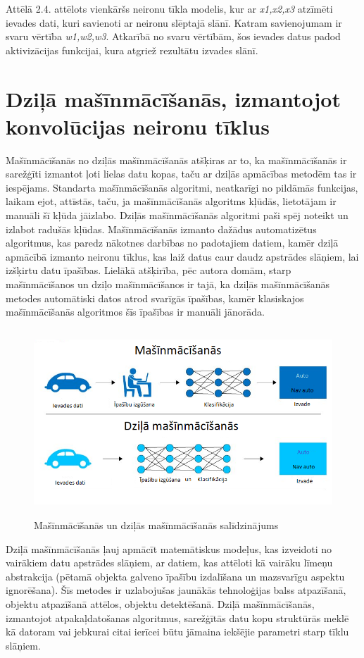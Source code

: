 Attēlā 2.4. attēlots vienkāršs neironu tīkla modelis, kur ar \textit{x1,x2,x3} atzīmēti ievades dati, kuri savienoti ar neironu slēptajā slānī. Katram savienojumam ir svaru vērtība \textit{w1,w2,w3}. Atkarībā no svaru vērtībām, šos ievades datus padod aktivizācijas funkcijai, kura atgriež rezultātu izvades slānī.
\section{Dziļā mašīnmācīšanās, izmantojot konvolūcijas neironu tīklus}
Mašīnmācīšanās no dziļās mašīnmācīšanās atšķiras ar to, ka mašīnmācīšanās ir sarežģīti izmantot ļoti lielas datu kopas, taču ar dziļās apmācības metodēm tas ir iespējams. Standarta mašīnmācīšanās algoritmi, neatkarīgi no pildāmās funkcijas, laikam ejot, attīstās, taču, ja mašīnmācīšanās algoritms kļūdās, lietotājam ir manuāli šī kļūda jāizlabo. Dziļās mašīnmācīšanās algoritmi paši spēj noteikt un izlabot radušās kļūdas. Mašīnmācīšanās izmanto dažādus automatizētus algoritmus, kas paredz nākotnes darbības no padotajiem datiem, kamēr dziļā apmācībā izmanto neironu tīklus, kas laiž datus caur daudz apstrādes slāņiem, lai izšķirtu datu īpašības. Lielākā atšķirība, pēc autora domām, starp mašīnmācīšanos un dziļo mašīnmācīšanos ir tajā, ka dziļās mašīnmācīšanās metodes automātiski datos atrod svarīgās īpašības, kamēr klasiskajos mašīnmācīšanās algoritmos šīs īpašības ir manuāli jānorāda. 
\begin{figure}[h]%
	\centering
	\includegraphics[height=7cm]{images/deeplearning.png} %
	\caption{Mašīnmācīšanās un dziļās mašīnmācīšanās salīdzinājums}%
	\label{fig:example}%
\end{figure}

Dziļā mašīnmācīšanās ļauj apmācīt matemātiskus modeļus, kas izveidoti no vairākiem datu apstrādes slāņiem, ar datiem, kas attēloti kā vairāku līmeņu abstrakcija (pētamā objekta galveno īpašību izdalīšana un mazsvarīgu aspektu ignorēšana). Šīs metodes ir uzlabojušas jaunākās tehnoloģijas balss atpazīšanā, objektu atpazīšanā attēlos, objektu detektēšanā. Dziļā mašīnmācīšanās, izmantojot atpakaļdatošanas algoritmus, sarežģītās datu kopu struktūrās meklē kā datoram vai jebkurai citai ierīcei būtu jāmaina iekšējie parametri starp tīklu slāņiem.

